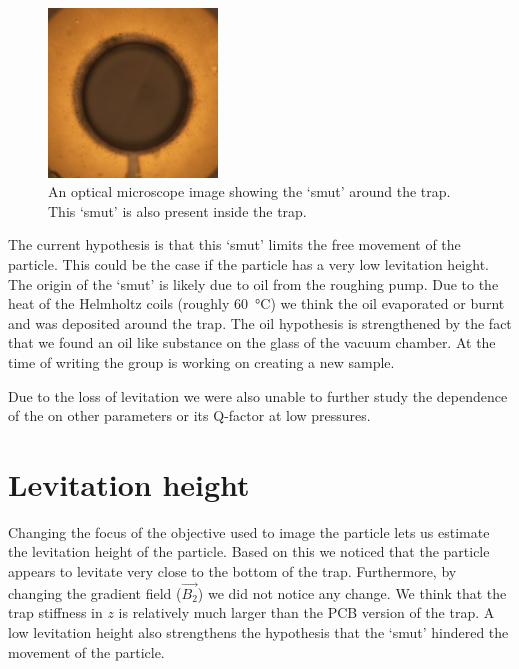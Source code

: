 \begin{figure}
    \centering
    \includegraphics[width=0.4\textwidth]{figures/sample/dirt_optical_microscope.jpeg}
    \caption{An optical microscope image showing the `smut' around the trap. This `smut' is also present inside the trap.}
    \label{fig:smut-optical-microscope}
\end{figure}

The current hypothesis is that this `smut' limits the free movement of the particle. This could be the case if the particle has a very low levitation height. The origin of the `smut' is likely due to oil from the roughing pump. Due to the heat of the Helmholtz coils (roughly \qty{60}{\celsius}) we think the oil evaporated or burnt and was deposited around the trap. The oil hypothesis is strengthened by the fact that we found an oil like substance on the glass of the vacuum chamber. At the time of writing the group is working on creating a new sample.

Due to the loss of levitation we were also unable to further study the dependence of the \zmode on other parameters or its Q-factor at low pressures.

\section*{Levitation height}
Changing the focus of the objective used to image the particle lets us estimate the levitation height of the particle. Based on this we noticed that the particle appears to levitate very close to the bottom of the trap. Furthermore, by changing the gradient field ($\vec{B_2}$) we did not notice any change. We think that the trap stiffness in $z$ is relatively much larger than the PCB version of the trap. A low levitation height also strengthens the hypothesis that the `smut' hindered the movement of the particle.
